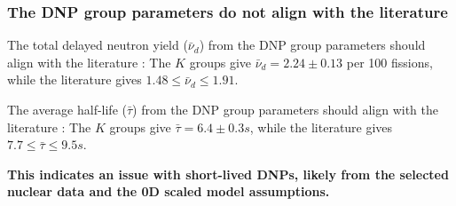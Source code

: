 \begin{frame}
\frametitle{The \gls{DNP} group parameters do not align with the literature}
\begin{block}{The total delayed neutron yield ($\bar{\nu}_d$) from the \gls{DNP} group parameters should align with the literature \cite{bank2000jef, santamarina2009jeff, chadwick2011endf, endf6, mills1991study, brady1989delayed, chadwick2006endf, keepin1957delayed, charlton1996delayed, saleh1997measurements, synetos1983delayed, tuttle1975delayed, waldo1981delayed}:}
The $K$ groups give $\bar{\nu}_d = 2.24 \pm 0.13$ per 100 fissions, while the literature gives $1.48 \leq \bar{\nu}_d \leq 1.91$.
\end{block}
\begin{block}{The average half-life ($\bar{\tau}$) from the \gls{DNP} group parameters should align with the literature \cite{endf6, mills1991study, brady1989delayed, keepin1957delayed, charlton1996delayed, saleh1997measurements, synetos1983delayed, tuttle1975delayed, waldo1981delayed}:}
The $K$ groups give $\bar{\tau} = 6.4 \pm 0.3 s$, while the literature gives $7.7 \leq \bar{\tau} \leq 9.5 s$.
\end{block}
\textbf{This indicates an issue with short-lived \glspl{DNP}, likely from the selected nuclear data and the 0D scaled model assumptions.}
\end{frame}